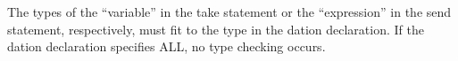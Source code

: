 




The types of the ``variable'' in the take statement or the
``expression'' in the send statement, respectively, must fit to 
the type in the dation declaration. If the dation declaration 
specifies ALL, no type checking occurs.

